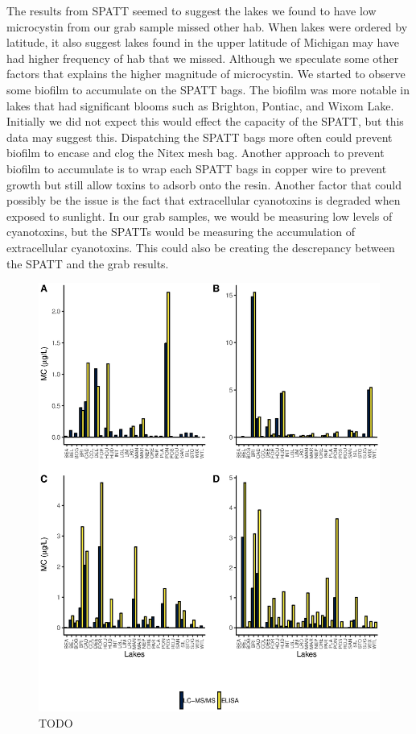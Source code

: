 The results from SPATT seemed to suggest the lakes we found to have low microcystin from our grab sample missed other \gls{hab}. When lakes were ordered by latitude, it also suggest lakes found in the upper latitude of Michigan may have had higher frequency of \gls{hab} that we missed. Although we speculate some other factors that explains the higher magnitude of microcystin. We started to observe  some biofilm to accumulate on the SPATT bags. The biofilm was more notable in lakes that had significant blooms such as Brighton, Pontiac, and Wixom Lake. Initially we did not expect this would effect the capacity of the SPATT, but this data may suggest this. Dispatching the SPATT bags more often could prevent biofilm to encase and clog the Nitex mesh bag. Another approach to prevent biofilm to accumulate is to wrap each SPATT bags in copper wire to prevent growth but still allow toxins to adsorb onto the resin. Another factor that could possibly be the issue is the fact that extracellular cyanotoxins is degraded when exposed to sunlight. In our grab samples, we would be measuring low levels of cyanotoxins, but the SPATTs would be measuring the accumulation of extracellular cyanotoxins. This could also be creating the descrepancy between the SPATT and the grab results. 

\begin{figure}[!h]
	\includegraphics[width=\textwidth]{figures/compare}
	\caption{TODO}
	\label{fig:compare}
\end{figure}



